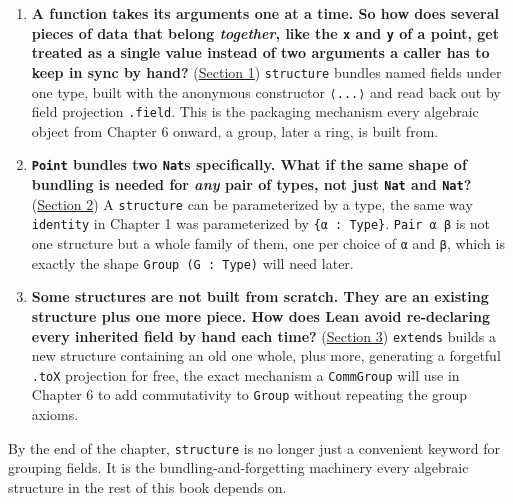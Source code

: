 \begin{enumerate}
\def\labelenumi{\arabic{enumi}.}
\tightlist
\item
  \textbf{A function takes its arguments one at a time. So how does several pieces of data that belong \emph{together}, like the \texttt{x} and \texttt{y} of a point, get treated as a single value instead of two arguments a caller has to keep in sync by hand?} (\hyperref[sec:02-functions-and-structures:01-structure-basics:1]{Section 1}) \texttt{structure} bundles named fields under one type, built with the anonymous constructor \texttt{⟨...⟩} and read back out by field projection \texttt{.field}. This is the packaging mechanism every algebraic object from Chapter 6 onward, a group, later a ring, is built from.
\item
  \textbf{\texttt{Point} bundles two \texttt{Nat}s specifically. What if the same shape of bundling is needed for \emph{any} pair of types, not just \texttt{Nat} and \texttt{Nat}?} (\hyperref[sec:02-functions-and-structures:02-type-parameters:1]{Section 2}) A \texttt{structure} can be parameterized by a type, the same way \texttt{identity} in Chapter 1 was parameterized by \texttt{\{α : Type\}}. \texttt{Pair α β} is not one structure but a whole family of them, one per choice of \texttt{α} and \texttt{β}, which is exactly the shape \texttt{Group (G : Type)} will need later.
\item
  \textbf{Some structures are not built from scratch. They are an existing structure plus one more piece. How does Lean avoid re-declaring every inherited field by hand each time?} (\hyperref[sec:02-functions-and-structures:03-extending-structures:1]{Section 3}) \texttt{extends} builds a new structure containing an old one whole, plus more, generating a forgetful \texttt{.toX} projection for free, the exact mechanism a \texttt{CommGroup} will use in Chapter 6 to add commutativity to \texttt{Group} without repeating the group axioms.
\end{enumerate}

By the end of the chapter, \texttt{structure} is no longer just a convenient keyword for grouping fields. It is the bundling-and-forgetting machinery every algebraic structure in the rest of this book depends on.






